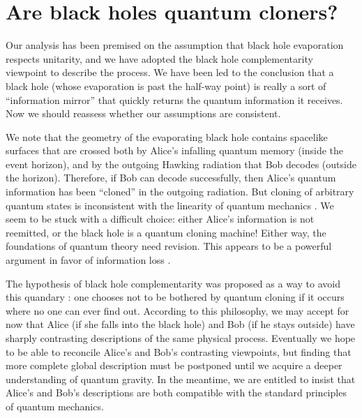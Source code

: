 \documentclass[12pt]{article}
\begin{document}
\section{Are black holes quantum cloners?}
\label{sec:cloning}

Our analysis has been premised on the assumption that black hole evaporation respects unitarity, and we have adopted the black hole complementarity viewpoint to describe the process. We have been led to the conclusion that a black hole (whose evaporation is past the half-way point) is really a sort of ``information mirror'' that quickly returns the quantum information it receives. Now we should reassess whether our assumptions are consistent. 

We note that the geometry of the evaporating black hole contains spacelike surfaces that are crossed  both by Alice's infalling quantum memory (inside the event horizon), and by the outgoing Hawking radiation that Bob decodes (outside the horizon). Therefore, if Bob can decode successfully, then Alice's quantum information has been ``cloned'' in the outgoing radiation. But cloning of arbitrary quantum states is inconsistent with the linearity of quantum mechanics \cite{no-cloning,dieks}. We seem to be stuck with a difficult choice: either Alice's information is not reemitted, or the black hole is a quantum cloning machine! Either way, the foundations of quantum theory need revision. This appears to be a powerful argument in favor of information loss \cite{preskill-destroy}. 

The hypothesis of black hole complementarity was proposed as a way to avoid this quandary \cite{complement,susskind-book}: one chooses not to be bothered by quantum cloning if it occurs where no one can ever find out. According to this philosophy, we may accept for now that Alice (if she falls into the black hole) and Bob (if he stays outside) have sharply contrasting descriptions of the same physical process. Eventually we hope to be able to reconcile Alice's and Bob's contrasting viewpoints, but finding that more complete global description must be postponed until we acquire a deeper understanding of quantum gravity. In the meantime, we are entitled to insist that Alice's and Bob's descriptions are both compatible with the standard principles of quantum mechanics.
\end{document}
